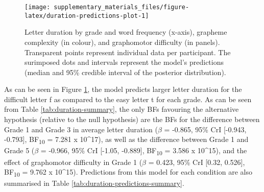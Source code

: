 \documentclass[
  11pt,
  english,
  ,doc,floatsintext]{apa6}
\begin{document}
\begin{figure}[!htb]

{\centering \texttt{[image: supplementary\_materials\_files/figure-latex/duration-predictions-plot-1]} 

}

\caption{Letter duration by grade and word frequency (x-axis), grapheme complexity (in colour), and graphomotor difficulty (in panels). Transparent points represent individual data per participant. The surimposed dots and intervals represent the model's predictions (median and 95\% credible interval of the posterior distribution).}\label{fig:duration-predictions-plot}
\end{figure}

As can be seen in Figure \ref{fig:duration-predictions-plot}, the model predicts larger letter duration for the difficult letter f as compared to the easy letter t for each grade. As can be seen from Table \ref{tab:duration-summary}, the only BFs favouring the alternative hypothesis (relative to the null hypothesis) are the BFs for the difference between Grade 1 and Grade 3 in average letter duration (\(\beta\) = -0.865, 95\% CrI {[}-0.943, -0.793{]}, BF\textsubscript{10} = 7.281 x 10\^{}17), as well as the difference between Grade 1 and Grade 5 (\(\beta\) = -0.966, 95\% CrI {[}-1.05, -0.889{]}, BF\textsubscript{10} = 3.586 x 10\^{}15), and the effect of graphomotor difficulty in Grade 1 (\(\beta\) = 0.423, 95\% CrI {[}0.32, 0.526{]}, BF\textsubscript{10} = 9.762 x 10\^{}15). Predictions from this model for each condition are also summarised in Table \ref{tab:duration-predictions-summary}.
\end{document}
